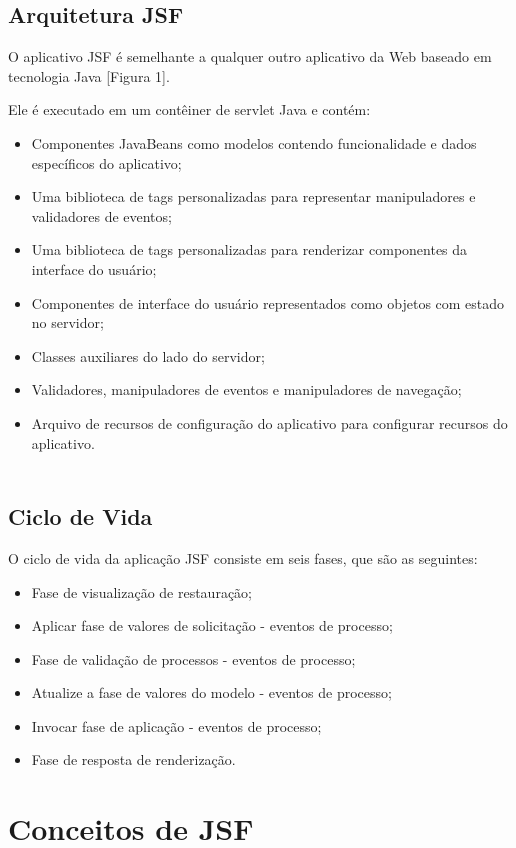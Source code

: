 \documentclass[	DIV=calc,%
							paper=a4,%
							fontsize=12pt,%
							onecolumn]{scrartcl}	 					%
\begin{document}
\subsection{Arquitetura JSF}

O aplicativo JSF é semelhante a qualquer outro aplicativo da Web baseado em tecnologia Java [Figura 1].

Ele é executado em um contêiner de servlet Java e contém:
\begin{itemize}
\item Componentes JavaBeans como modelos contendo funcionalidade e dados específicos do aplicativo;
\item Uma biblioteca de tags personalizadas para representar manipuladores e validadores de eventos;
\item Uma biblioteca de tags personalizadas para renderizar componentes da interface do usuário;
\item Componentes de interface do usuário representados como objetos com estado no servidor;
\item Classes auxiliares do lado do servidor;
\item Validadores, manipuladores de eventos e manipuladores de navegação;
\item Arquivo de recursos de configuração do aplicativo para configurar recursos do aplicativo.\\~\\
\end{itemize}


\subsection{Ciclo de Vida}

O ciclo de vida da aplicação JSF consiste em seis fases, que são as seguintes:
\begin{itemize}
\item Fase de visualização de restauração;
\item Aplicar fase de valores de solicitação - eventos de processo;
\item Fase de validação de processos - eventos de processo;
\item Atualize a fase de valores do modelo - eventos de processo;
\item Invocar fase de aplicação - eventos de processo;
\item Fase de resposta de renderização.
\end{itemize}

\section{Conceitos de JSF}
\end{document}
